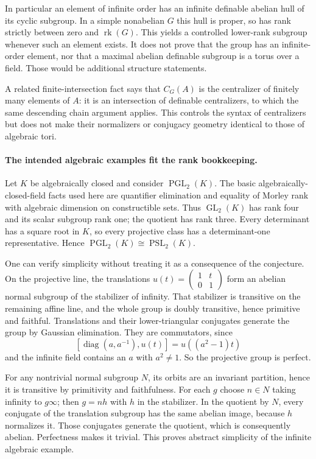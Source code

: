 \documentclass[11pt]{article}
\begin{document}
In particular an element of infinite order has an infinite definable
abelian hull of its cyclic subgroup. In a simple nonabelian $G$ this
hull is proper, so has rank strictly between zero and
$\operatorname{rk}(G)$. This yields a controlled lower-rank subgroup
whenever such an element exists. It does not prove that the group has
an infinite-order element, nor that a maximal abelian definable subgroup
is a torus over a field. Those would be additional structure statements.

A related finite-intersection fact says that $C_G(A)$ is the centralizer
of finitely many elements of $A$: it is an intersection of definable
centralizers, to which the same descending chain argument applies.
This controls the syntax of centralizers but does not make their
normalizers or conjugacy geometry identical to those of algebraic tori.

\paragraph{The intended algebraic examples fit the rank bookkeeping.}
Let $K$ be algebraically closed and consider $\operatorname{PGL}_2(K)$.
The basic algebraically-closed-field facts used here are quantifier
elimination and equality of Morley rank with algebraic dimension on
constructible sets. Thus $\operatorname{GL}_2(K)$ has rank four and
its scalar subgroup rank one; the quotient has rank three.
Every determinant has a square root in $K$, so every projective class
has a determinant-one representative. Hence
$\operatorname{PGL}_2(K)\cong\operatorname{PSL}_2(K)$.

One can verify simplicity without treating it as a consequence of the
conjecture. On the projective line, the translations
$u(t)=\left(\begin{smallmatrix}1&t\\0&1\end{smallmatrix}\right)$
form an abelian normal subgroup of the stabilizer of infinity. That
stabilizer is transitive on the remaining affine line, and the whole
group is doubly transitive, hence primitive and faithful.
Translations and their lower-triangular conjugates generate the group
by Gaussian elimination. They are commutators, since
\[
 [\operatorname{diag}(a,a^{-1}),u(t)]=u((a^2-1)t)
\]
and the infinite field contains an $a$ with $a^2\ne1$.
So the projective group is perfect.

For any nontrivial normal subgroup $N$, its orbits are an invariant
partition, hence it is transitive by primitivity and faithfulness.
For each $g$ choose $n\in N$ taking infinity to $g\infty$; then
$g=nh$ with $h$ in the stabilizer. In the quotient by $N$, every
conjugate of the translation subgroup has the same abelian image,
because $h$ normalizes it. Those conjugates generate the quotient,
which is consequently abelian. Perfectness makes it trivial. This
proves abstract simplicity of the infinite algebraic example.
\end{document}
